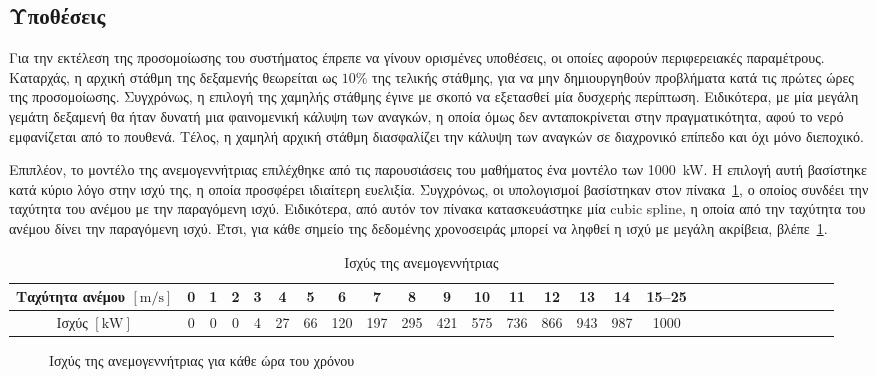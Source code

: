 \subsection{Υποθέσεις}
Για την εκτέλεση της προσομοίωσης του συστήματος έπρεπε να γίνουν ορισμένες
υποθέσεις, οι οποίες αφορούν περιφερειακές παραμέτρους. Καταρχάς, η αρχική
στάθμη της δεξαμενής θεωρείται ως \(10\%\) της τελικής στάθμης, για να μην
δημιουργηθούν προβλήματα κατά τις πρώτες ώρες της προσομοίωσης. Συγχρόνως, η
επιλογή της χαμηλής στάθμης έγινε με σκοπό να εξετασθεί μία δυσχερής περίπτωση.
Ειδικότερα, με μία μεγάλη γεμάτη δεξαμενή θα ήταν δυνατή μια φαινομενική κάλυψη
των αναγκών, η οποία όμως δεν ανταποκρίνεται στην πραγματικότητα, αφού το νερό
εμφανίζεται από το πουθενά. Τέλος, η χαμηλή αρχική στάθμη διασφαλίζει την
κάλυψη των αναγκών σε διαχρονικό επίπεδο και όχι μόνο διεποχικό.

Επιπλέον, το μοντέλο της ανεμογεννήτριας επιλέχθηκε από τις παρουσιάσεις του
μαθήματος ένα μοντέλο των \qty{1000}{\kilo\watt}. Η επιλογή αυτή βασίστηκε κατά
κύριο λόγο στην ισχύ της, η οποία προσφέρει ιδιαίτερη ευελιξία. Συγχρόνως, οι
υπολογισμοί βασίστηκαν στον πίνακα~\ref{tab:wind_turbine_data}, ο οποίος συνδέει την ταχύτητα του ανέμου με
την παραγόμενη ισχύ. Ειδικότερα, από αυτόν τον πίνακα κατασκευάστηκε μία cubic
spline, η οποία από την ταχύτητα του ανέμου δίνει την παραγόμενη ισχύ. Έτσι,
για κάθε σημείο της δεδομένης χρονοσειράς μπορεί να ληφθεί η ισχύ με μεγάλη
ακρίβεια, βλέπε~\ref{fig:wt_power_curve}.

\begin{table}
	\centering
	\caption{Ισχύς της ανεμογεννήτριας}\label{tab:wind_turbine_data}
	\footnotesize
	\begin{tabular}{@{}ccccccccccccccccccccccccccc@{}}
		\toprule
		Ταχύτητα ανέμου \(\left[\si{\meter\per\second}\right]\) & 0 & 1 & 2 & 3 & 4  & 5  & 6   & 7   & 8   & 9   & 10  & 11  & 12  & 13  & 14  & 15--25 \\ \midrule \midrule
		Ισχύς \(\left[\si{\kilo\watt}\right]\)                  & 0 & 0 & 0 & 4 & 27 & 66 & 120 & 197 & 295 & 421 & 575 & 736 & 866 & 943 & 987 & 1000   \\ \bottomrule
	\end{tabular}
\end{table}

\begin{figure}
	\centering
	\caption{Ισχύς της ανεμογεννήτριας για κάθε ώρα του χρόνου}\label{fig:wt_power_curve}
\end{figure}

